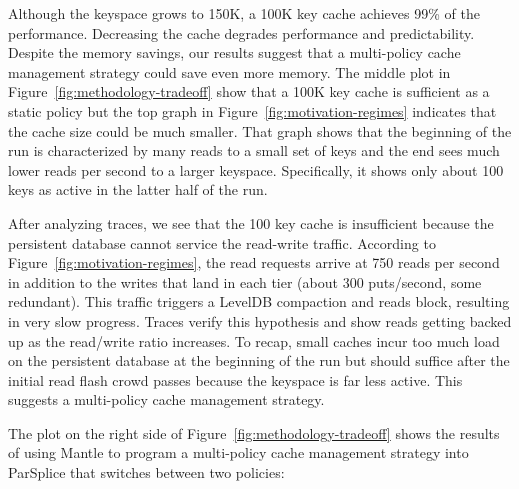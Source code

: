Although the keyspace grows to 150K, a 100K key cache achieves 99\% of the
performance. Decreasing the cache degrades performance and predictability.
Despite the memory savings, our results suggest that a multi-policy cache management strategy
could save even more memory.  The middle plot in
Figure~\ref{fig:methodology-tradeoff} show that a 100K key cache is sufficient
as a static policy but the top graph in Figure~\ref{fig:motivation-regimes}
indicates that the cache size could be much smaller. That graph shows that the
beginning of the run is characterized by many reads to a small set of keys and
the end sees much lower reads per second to a larger keyspace. Specifically, it
shows only about 100 keys as active in the latter half of the run.

After analyzing traces, we see that the 100 key cache is insufficient because
the persistent database cannot service the read-write traffic.  According to
Figure~\ref{fig:motivation-regimes}, the read requests arrive at 750 reads per
second in addition to the writes that land in each tier (about 300 puts/second,
some redundant). This traffic triggers a LevelDB compaction and reads block,
resulting in very slow progress.  Traces verify this hypothesis and show reads
getting backed up as the read/write ratio increases. To recap, small caches
incur too much load on the persistent database  at the beginning of the run but
should suffice after the initial read flash crowd passes because
the keyspace is far less active. This suggests a multi-policy cache management
strategy.


The plot on the right side of Figure~\ref{fig:methodology-tradeoff} shows the results of using Mantle
to program a multi-policy cache management strategy into ParSplice that switches between
two policies:

